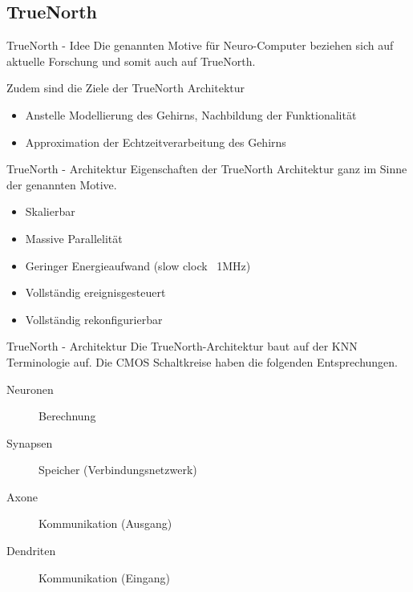 \subsection{TrueNorth}

\begin{slide}{TrueNorth - Idee}
	Die genannten Motive für Neuro-Computer beziehen sich auf aktuelle Forschung und somit auch auf TrueNorth.
	
	Zudem sind die Ziele der TrueNorth Architektur

	\begin{itemize}
		\item Anstelle Modellierung des Gehirns, Nachbildung der Funktionalität
		\item Approximation der Echtzeitverarbeitung des Gehirns
	\end{itemize}
\end{slide}

\begin{slide}{TrueNorth - Architektur}
	Eigenschaften der TrueNorth Architektur ganz im Sinne der genannten Motive.
	
	\begin{itemize}
		\item Skalierbar
		\item Massive Parallelität
		\item Geringer Energieaufwand (slow clock ~1MHz)
		\item Vollständig ereignisgesteuert
		\item Vollständig rekonfigurierbar
	\end{itemize}
\end{slide}

\begin{slide}{TrueNorth - Architektur}
	Die TrueNorth-Architektur baut auf der KNN Terminologie auf. Die CMOS Schaltkreise haben die folgenden Entsprechungen.
	
	\begin{description}
	    \item[Neuronen] Berechnung
	    \item[Synapsen] Speicher (Verbindungsnetzwerk)
	    \item[Axone] Kommunikation (Ausgang)
	    \item[Dendriten] Kommunikation (Eingang)
	\end{description}
\end{slide}

